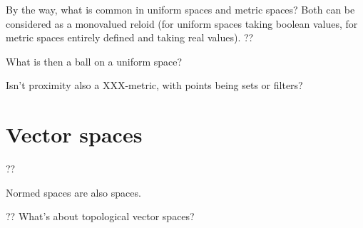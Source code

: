 By the way, what is common in uniform spaces and metric spaces? Both can be considered as a monovalued reloid (for uniform spaces taking boolean values, for metric spaces entirely defined and taking real values). ??

What is then a ball on a uniform space?

Isn't proximity also a XXX-metric, with points being sets or filters?

\section{Vector spaces}

??

Normed spaces are also spaces.

?? What's about topological vector spaces?
